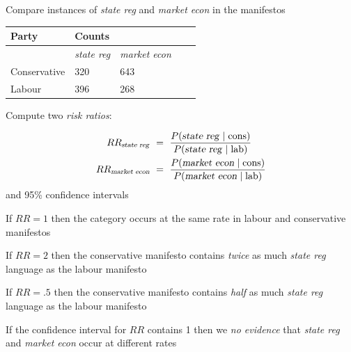 \documentclass[11pt,compress,professionalfonts]{beamer}
\begin{document}
Compare instances of \textsl{state reg} and \textsl{market econ} in the manifestos\\
\begin{center}
\begin{tabular}{lllll}\toprule
Party & \multicolumn{2}{l}{Counts}  \\ \midrule 
      & \textsl{state reg}    &    \textsl{market econ}  \\ 
Conservative  & 320   & 643 \\ 
Labour   & 396   & 268      \\ \bottomrule
\end{tabular}
\end{center}


Compute two \textsl{risk ratios}:

\begin{align*}
RR_{\text{\textsl{state reg}}} & ~=~ \frac{P(\text{\textsl{state reg}} \mid \text{cons})}
{P(\text{\textsl{state reg}} \mid \text{lab})}\\
RR_{\text{\textsl{market econ}}} & ~=~ \frac{P(\text{\textsl{market econ}} \mid \text{cons})}
{P(\text{\textsl{market econ}} \mid \text{lab})}
\end{align*}
and 95\% confidence intervals

%
%
%

If $RR=1$ then the category occurs at the same rate in labour and conservative manifestos

If $RR=2$ then the conservative manifesto contains \textsl{twice} as much \textsl{state reg} language as the labour manifesto

If $RR=.5$ then the conservative manifesto contains \textsl{half} as much \textsl{state reg} language as the labour manifesto

If the confidence interval for $RR$ contains 1 then we \textsl{no evidence} that \textsl{state reg} and \textsl{market econ} occur at different rates
\end{document}

